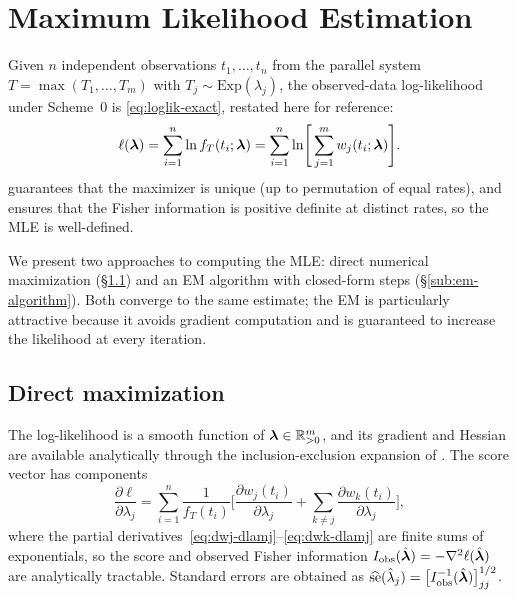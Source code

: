 \section{Maximum Likelihood Estimation}
\label{sec:estimation}

Given $n$ independent observations $t_1,\ldots,t_n$ from the parallel
system $T = \max(T_1,\ldots,T_m)$ with $T_j \sim \mathrm{Exp}(\lambda_j)$,
the observed-data log-likelihood under Scheme~0 is
\eqref{eq:loglik-exact}, restated here for reference:
\[
  \ell(\boldsymbol{\lambda})
  = \sum_{i=1}^{n} \ln f_T(t_i;\boldsymbol{\lambda})
  = \sum_{i=1}^{n} \ln \Biggl[\,\sum_{j=1}^{m} w_j(t_i;\boldsymbol{\lambda})\Biggr].
\]
 guarantees that the maximizer is unique
(up to permutation of equal rates), and  ensures
that the Fisher information is positive definite at distinct rates, so the
MLE is well-defined.

We present two approaches to computing the MLE: direct numerical
maximization (\S\ref{sub:direct-mle}) and an EM algorithm with
closed-form steps (\S\ref{sub:em-algorithm}).  Both converge to the
same estimate; the EM is particularly attractive because it avoids
gradient computation and is guaranteed to increase the likelihood at
every iteration.

\subsection{Direct maximization}
\label{sub:direct-mle}

The log-likelihood is a smooth function of
$\boldsymbol{\lambda} \in \mathbb{R}_{>0}^m$, and its gradient and Hessian are available
analytically through the inclusion-exclusion expansion of
.  The score vector has components
\begin{equation}
  \label{eq:score}
  \frac{\partial \ell}{\partial \lambda_j}
  = \sum_{i=1}^{n}
    \frac{1}{f_T(t_i)}
    \Biggl[
      \frac{\partial w_j(t_i)}{\partial \lambda_j}
      + \sum_{k \neq j} \frac{\partial w_k(t_i)}{\partial \lambda_j}
    \Biggr],
\end{equation}
where the partial derivatives~\eqref{eq:dwj-dlamj}--\eqref{eq:dwk-dlamj}
are finite sums of exponentials, so the score and observed Fisher information
$I_{\mathrm{obs}}(\hat{\boldsymbol{\lambda}}) = -\nabla^2 \ell(\hat{\boldsymbol{\lambda}})$
are analytically tractable.  Standard errors are obtained as
$\widehat{\mathrm{se}}(\hat\lambda_j)
= \bigl[I_{\mathrm{obs}}^{-1}(\hat{\boldsymbol{\lambda}})\bigr]_{jj}^{1/2}$.

